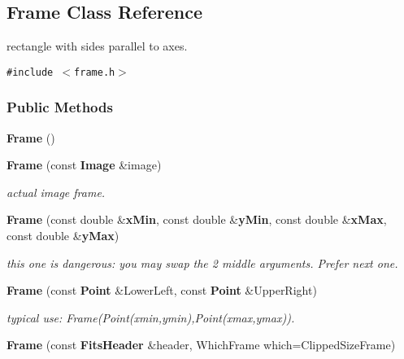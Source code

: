 \subsection{Frame  Class Reference}
\label{class_frame}
rectangle with sides parallel to axes. 


{\tt \#include $<$frame.h$>$}

\subsubsection*{Public Methods}
\begin{CompactItemize}
\item 
{}
{\bf Frame} ()\label{class_frame_a0}

\item 
{}
{\bf Frame} (const {\bf Image} \&image)\label{class_frame_a1}

\begin{CompactList}\small\item\em actual image frame.\item\end{CompactList}\item 
{}
{\bf Frame} (const double \&{\bf x\-Min}, const double \&{\bf y\-Min}, const double \&{\bf x\-Max}, const double \&{\bf y\-Max})\label{class_frame_a2}

\begin{CompactList}\small\item\em this one is dangerous: you may swap the 2 middle arguments. Prefer next one.\item\end{CompactList}\item 
{}
{\bf Frame} (const {\bf Point} \&Lower\-Left, const {\bf Point} \&Upper\-Right)\label{class_frame_a3}

\begin{CompactList}\small\item\em typical use: Frame(Point(xmin,ymin),Point(xmax,ymax)).\item\end{CompactList}\item 
{}
{\bf Frame} (const {\bf Fits\-Header} \&header, Which\-Frame which=Clipped\-Size\-Frame)\label{class_frame_a4}


\end{CompactItemize}
